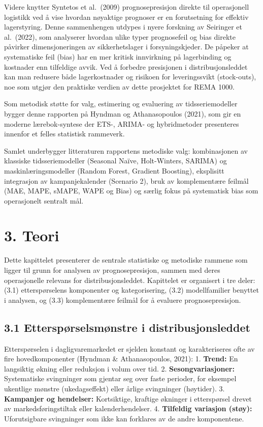 \documentclass[
  norsk,
  11pt,
  a4paper,
]{article}
\begin{document}
Videre knytter Syntetos et al.~(2009) prognosepresisjon direkte til
operasjonell logistikk ved å vise hvordan nøyaktige prognoser er en
forutsetning for effektiv lagerstyring. Denne sammenhengen utdypes i
nyere forskning av Seiringer et al.~(2022), som analyserer hvordan ulike
typer prognosefeil og bias direkte påvirker dimensjoneringen av
sikkerhetslager i forsyningskjeder. De påpeker at systematiske feil
(bias) har en mer kritisk innvirkning på lagerbinding og kostnader enn
tilfeldige avvik. Ved å forbedre presisjonen i distribusjonsleddet kan
man redusere både lagerkostnader og risikoen for leveringssvikt
(stock-outs), noe som utgjør den praktiske verdien av dette prosjektet
for REMA 1000.

Som metodisk støtte for valg, estimering og evaluering av
tidsseriemodeller bygger denne rapporten på Hyndman og Athanasopoulos
(2021), som gir en moderne lærebok-syntese der ETS-, ARIMA- og
hybridmetoder presenteres innenfor et felles statistisk rammeverk.

Samlet underbygger litteraturen rapportens metodiske valg: kombinasjonen
av klassiske tidsseriemodeller (Seasonal Naïve, Holt-Winters, SARIMA) og
maskinlæringsmodeller (Random Forest, Gradient Boosting), eksplisitt
integrasjon av kampanjekalender (Scenario 2), bruk av komplementære
feilmål (MAE, MAPE, sMAPE, WAPE og Bias) og særlig fokus på systematisk
bias som operasjonelt sentralt mål.

\section{3. Teori}\label{teori}

Dette kapittelet presenterer de sentrale statistiske og metodiske
rammene som ligger til grunn for analysen av prognosepresisjon, sammen
med deres operasjonelle relevans for distribusjonsleddet. Kapittelet er
organisert i tre deler: (3.1) etterspørselens komponenter og
kategorisering, (3.2) modellfamilier benyttet i analysen, og (3.3)
komplementære feilmål for å evaluere prognosepresisjon.

\subsection{3.1 Etterspørselsmønstre i
distribusjonsleddet}\label{etterspuxf8rselsmuxf8nstre-i-distribusjonsleddet}

Etterspørselen i dagligvaremarkedet er sjelden konstant og
karakteriseres ofte av fire hovedkomponenter (Hyndman \& Athanasopoulos,
2021): 1. \textbf{Trend:} En langsiktig økning eller reduksjon i volum
over tid. 2. \textbf{Sesongvariasjoner:} Systematiske svingninger som
gjentar seg over faste perioder, for eksempel ukentlige mønstre
(ukedagseffekt) eller årlige svingninger (høytider). 3.
\textbf{Kampanjer og hendelser:} Kortsiktige, kraftige økninger i
etterspørsel drevet av markedsføringstiltak eller kalenderhendelser. 4.
\textbf{Tilfeldig variasjon (støy):} Uforutsigbare svingninger som ikke
kan forklares av de andre komponentene.
\end{document}
